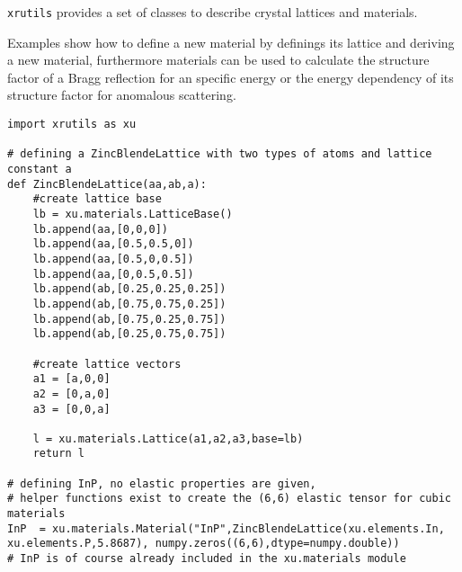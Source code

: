 %
%
%
%


{\tt xrutils} provides a set of classes to describe crystal lattices and 
materials.

Examples show how to define a new material by definings its lattice and deriving a new material, furthermore materials can be used to calculate the structure factor of a Bragg reflection for an specific energy or the energy dependency of its structure factor for anomalous scattering.

\begin{lstlisting}[caption=defining a new material from scratch. This consists of an lattice with base and the type of atoms with elastic constantsof the material.]
import xrutils as xu

# defining a ZincBlendeLattice with two types of atoms and lattice constant a
def ZincBlendeLattice(aa,ab,a):
    #create lattice base
    lb = xu.materials.LatticeBase()
    lb.append(aa,[0,0,0])
    lb.append(aa,[0.5,0.5,0])
    lb.append(aa,[0.5,0,0.5])
    lb.append(aa,[0,0.5,0.5])
    lb.append(ab,[0.25,0.25,0.25])
    lb.append(ab,[0.75,0.75,0.25])
    lb.append(ab,[0.75,0.25,0.75])
    lb.append(ab,[0.25,0.75,0.75])
    
    #create lattice vectors
    a1 = [a,0,0]
    a2 = [0,a,0]
    a3 = [0,0,a]
    
    l = xu.materials.Lattice(a1,a2,a3,base=lb)    
    return l

# defining InP, no elastic properties are given, 
# helper functions exist to create the (6,6) elastic tensor for cubic materials 
InP  = xu.materials.Material("InP",ZincBlendeLattice(xu.elements.In, xu.elements.P,5.8687), numpy.zeros((6,6),dtype=numpy.double))
# InP is of course already included in the xu.materials module
\end{lstlisting}

